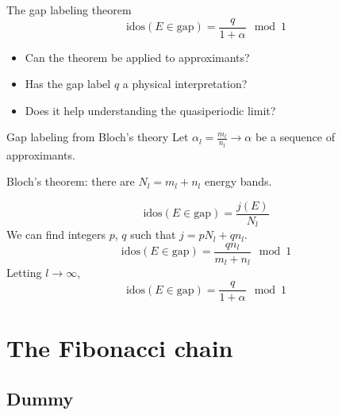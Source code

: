 \documentclass[xcolor=x11names,compress,professionalfonts]{beamer}
\renewcommand{\(}{\begin{columns}}
\renewcommand{\)}{\end{columns}}
\newcommand{\<}[1]{\begin{column}{#1}}
\renewcommand{\>}{\end{column}}
\newcommand{\id}{\ensuremath{\text{idos}}}
\begin{document}
\begin{frame}{The gap labeling theorem}
\[
		\id(E \in \text{gap}) = \frac{q}{1+\alpha} \mod 1
\]
\begin{itemize}
	\item Can the theorem be applied to approximants? 
	\item Has the gap label $q$ a physical interpretation?
	\item Does it help understanding the quasiperiodic limit?
\end{itemize}

\end{frame}

\begin{frame}{Gap labeling from Bloch's theory}
Let $\alpha_l = \frac{m_l}{n_l} \to \alpha$ be a sequence of approximants.

Bloch's theorem: there are $N_l = m_l + n_l$ energy bands.

\[
	\id(E \in \text{gap}) = \frac{j(E)}{N_l}
\]
We can find integers $p$, $q$ such that $j = p N_l + q n_l$.
\[
	\id(E \in \text{gap}) = \frac{q n_l}{m_l + n_l} \mod 1
\]
Letting $l \to \infty$,
	\[
		\id(E \in \text{gap}) = \frac{q}{1+\alpha} \mod 1
	\]

    

\end{frame}

\section{The Fibonacci chain}
\subsection{Dummy}
\end{document}
